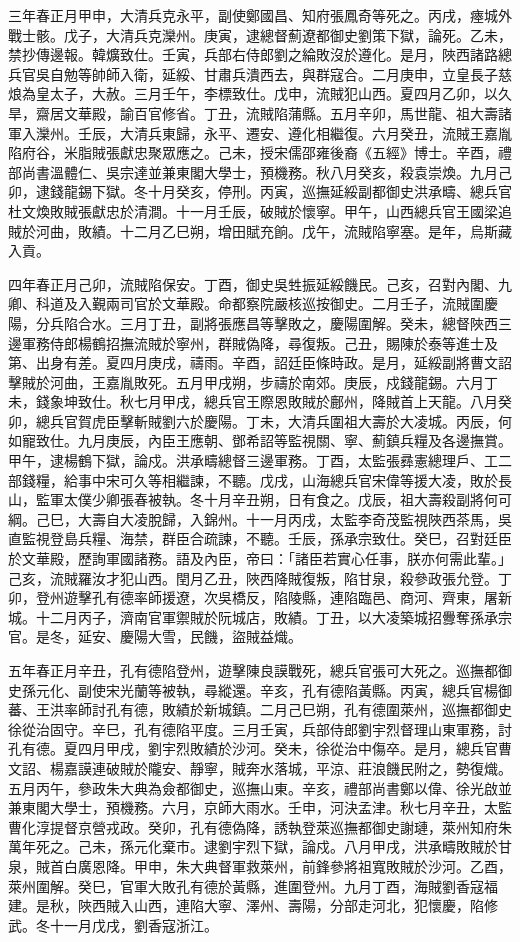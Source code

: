 \begin{pinyinscope}
三年春正月甲申，大清兵克永平，副使鄭國昌、知府張鳳奇等死之。丙戌，瘞城外戰士骸。戊子，大清兵克灤州。庚寅，逮總督薊遼都御史劉策下獄，論死。乙未，禁抄傳邊報。韓爌致仕。壬寅，兵部右侍郎劉之綸敗沒於遵化。是月，陜西諸路總兵官吳自勉等帥師入衛，延綏、甘肅兵潰西去，與群寇合。二月庚申，立皇長子慈烺為皇太子，大赦。三月壬午，李標致仕。戊申，流賊犯山西。夏四月乙卯，以久旱，齋居文華殿，諭百官修省。丁丑，流賊陷蒲縣。五月辛卯，馬世龍、祖大壽諸軍入灤州。壬辰，大清兵東歸，永平、遷安、遵化相繼復。六月癸丑，流賊王嘉胤陷府谷，米脂賊張獻忠聚眾應之。己未，授宋儒邵雍後裔《五經》博士。辛酉，禮部尚書溫體仁、吳宗達並兼東閣大學士，預機務。秋八月癸亥，殺袁崇煥。九月己卯，逮錢龍錫下獄。冬十月癸亥，停刑。丙寅，巡撫延綏副都御史洪承疇、總兵官杜文煥敗賊張獻忠於清澗。十一月壬辰，破賊於懷寧。甲午，山西總兵官王國梁追賊於河曲，敗績。十二月乙巳朔，增田賦充餉。戊午，流賊陷寧塞。是年，烏斯藏入貢。

四年春正月己卯，流賊陷保安。丁酉，御史吳甡振延綏饑民。己亥，召對內閣、九卿、科道及入覲兩司官於文華殿。命都察院嚴核巡按御史。二月壬子，流賊圍慶陽，分兵陷合水。三月丁丑，副將張應昌等擊敗之，慶陽圍解。癸未，總督陜西三邊軍務侍郎楊鶴招撫流賊於寧州，群賊偽降，尋復叛。己丑，賜陳於泰等進士及第、出身有差。夏四月庚戌，禱雨。辛酉，詔廷臣條時政。是月，延綏副將曹文詔擊賊於河曲，王嘉胤敗死。五月甲戌朔，步禱於南郊。庚辰，戍錢龍錫。六月丁未，錢象坤致仕。秋七月甲戌，總兵官王際恩敗賊於鄜州，降賊首上天龍。八月癸卯，總兵官賀虎臣擊斬賊劉六於慶陽。丁未，大清兵圍祖大壽於大凌城。丙辰，何如寵致仕。九月庚辰，內臣王應朝、鄧希詔等監視關、寧、薊鎮兵糧及各邊撫賞。甲午，逮楊鶴下獄，論戍。洪承疇總督三邊軍務。丁酉，太監張彞憲總理戶、工二部錢糧，給事中宋可久等相繼諫，不聽。戊戌，山海總兵官宋偉等援大凌，敗於長山，監軍太僕少卿張春被執。冬十月辛丑朔，日有食之。戊辰，祖大壽殺副將何可綱。己巳，大壽自大凌脫歸，入錦州。十一月丙戌，太監李奇茂監視陜西茶馬，吳直監視登島兵糧、海禁，群臣合疏諫，不聽。壬辰，孫承宗致仕。癸巳，召對廷臣於文華殿，歷詢軍國諸務。語及內臣，帝曰：「諸臣若實心任事，朕亦何需此輩。」己亥，流賊羅汝才犯山西。閏月乙丑，陜西降賊復叛，陷甘泉，殺參政張允登。丁卯，登州遊擊孔有德率師援遼，次吳橋反，陷陵縣，連陷臨邑、商河、齊東，屠新城。十二月丙子，濟南官軍禦賊於阮城店，敗績。丁丑，以大凌築城招釁奪孫承宗官。是冬，延安、慶陽大雪，民饑，盜賊益熾。

五年春正月辛丑，孔有德陷登州，遊擊陳良謨戰死，總兵官張可大死之。巡撫都御史孫元化、副使宋光蘭等被執，尋縱還。辛亥，孔有德陷黃縣。丙寅，總兵官楊御蕃、王洪率師討孔有德，敗績於新城鎮。二月己巳朔，孔有德圍萊州，巡撫都御史徐從治固守。辛巳，孔有德陷平度。三月壬寅，兵部侍郎劉宇烈督理山東軍務，討孔有德。夏四月甲戌，劉宇烈敗績於沙河。癸未，徐從治中傷卒。是月，總兵官曹文詔、楊嘉謨連破賊於隴安、靜寧，賊奔水落城，平涼、莊浪饑民附之，勢復熾。五月丙午，參政朱大典為僉都御史，巡撫山東。辛亥，禮部尚書鄭以偉、徐光啟並兼東閣大學士，預機務。六月，京師大雨水。壬申，河決孟津。秋七月辛丑，太監曹化淳提督京營戎政。癸卯，孔有德偽降，誘執登萊巡撫都御史謝璉，萊州知府朱萬年死之。己未，孫元化棄市。逮劉宇烈下獄，論戍。八月甲戌，洪承疇敗賊於甘泉，賊首白廣恩降。甲申，朱大典督軍救萊州，前鋒參將祖寬敗賊於沙河。乙酉，萊州圍解。癸巳，官軍大敗孔有德於黃縣，進圍登州。九月丁酉，海賊劉香寇福建。是秋，陜西賊入山西，連陷大寧、澤州、壽陽，分部走河北，犯懷慶，陷修武。冬十一月戊戌，劉香寇浙江。


\end{pinyinscope}
